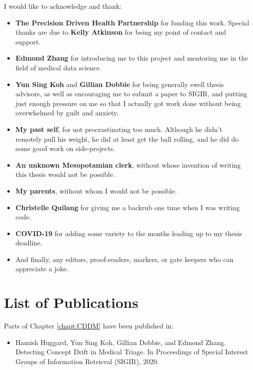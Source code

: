 \documentclass[12pt,examcopy]{uathesis}
\begin{document}
\begin{acknowledgements}
I would like to acknowledge and thank: 
\begin{itemize}
    \item {\bf The Precision Driven Health Partnership} for funding this work. Special thanks are due to {\bf Kelly Atkinson} for being my point of contact and support.
    \item {\bf Edmond Zhang} for introducing me to this project and mentoring me in the field of medical data science. 
    \item {\bf Yun Sing Koh} and {\bf Gillian Dobbie} for being generally swell thesis advisors, as well as encouraging me to submit a paper to SIGIR, and putting just enough pressure on me so that I actually got work done without being overwhelmed by guilt and anxiety. 
    \item {\bf My past self}, for not procrastinating too much. Although he didn't remotely pull his weight, he did at least get the ball rolling, and he did do some good work on side-projects.
    \item {\bf An unknown Mesopotamian clerk}, without whose invention of writing this thesis would not be possible.
    \item {\bf My parents}, without whom I would not be possible.
    \item {\bf Christelle Quilang} for giving me a backrub one time when I was writing code.
    \item {\bf COVID-19} for adding some variety to the months leading up to my thesis deadline.
    \item And finally, any editors, proof-readers, markers, or gate keepers who can appreciate a joke.
\end{itemize}
\end{acknowledgements}

\chapter*{List of Publications}

Parts of Chapter \ref{chapt:CDDM} have been published in:
\begin{itemize}
    \item Hamish Huggard, Yun Sing Koh, Gillian Dobbie, and Edmond Zhang. Detecting Concept Drift in Medical Triage. In Proceedings of Special Interest Groups of Information Retrieval (SIGIR), 2020.
\end{itemize}

\setcounter{tocdepth}{1}
\tableofcontents

\listoffigures

\listoftables

\mainmatter








\backmatter


\end{document}
